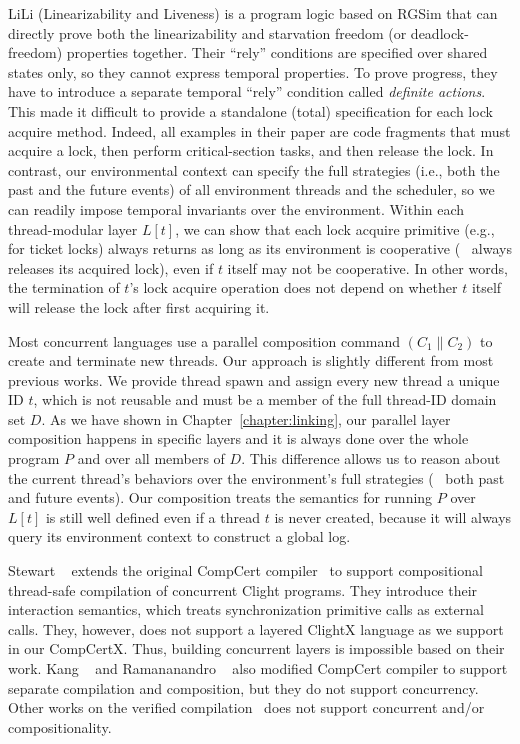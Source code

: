 LiLi (Linearizability and Liveness) is a program logic based on RGSim
that can
directly prove both the linearizability and starvation freedom (or
deadlock-freedom) properties together. 
Their ``rely'' conditions are specified
over shared states only, so they cannot express temporal properties. 
To prove progress, they have to introduce a separate temporal ``rely''
condition called {\em definite actions}.  This made it difficult to
provide a standalone (total) specification for each lock acquire
method.  Indeed, all examples in their paper are code fragments that
must acquire a lock, then perform critical-section tasks, and then release the
lock. In contrast, our environmental context can specify the full
strategies (i.e., both the past and the future events) of all
environment threads and the scheduler, so we can readily impose
temporal invariants over the environment. Within each thread-modular
layer $L[t]$, we can show that each lock acquire primitive (e.g., for
ticket locks) always returns as long as its environment is cooperative
(\eg~ always releases its acquired lock), even if $t$ itself may not
be cooperative.
In other words, the termination of $t$'s lock acquire
operation does not depend on whether $t$ itself will release the lock
after first acquiring it.

Most concurrent languages use a
parallel composition command $(C_1 \| C_2)$ to create and terminate
new threads.  
Our approach is slightly different from most previous works.
We provide thread spawn and assign every new thread a unique ID $t$,
which is not reusable and must be a member of the full thread-ID domain set $D$.
As we have shown in Chapter~\ref{chapter:linking},
our parallel layer composition happens in specific layers and it is
always done over the whole program $P$ and over
all members of $D$. 
This difference allows us to reason about the current
thread's behaviors over the environment's full strategies (\ie~ both
past and future events).
Our composition treats the semantics for running $P$ over $L[t]$ is still well
defined even if a thread $t$ is never
created, because it will always query its environment context to
construct a global log.



Stewart {\etal}~\cite{stewart15} extends the original CompCert compiler~\cite{compcert}  
to support compositional thread-safe compilation of concurrent Clight programs. 
They introduce their interaction semantics, which treats
synchronization
primitive calls as external calls.
They, however, does not support a layered ClightX language as we support in our CompCertX.  
Thus, building concurrent layers is impossible based on their work.
Kang \etal~\cite{hur16} and Ramananandro \etal~\cite{ramananandro:2015} also modified CompCert compiler to support separate compilation and composition, 
but they do not support concurrency.  
Other works on the verified compilation~\cite{Lochbihler10esop, Sevcik11popl, zhao:2013, kang:2018} does not support concurrent and/or compositionality. 


